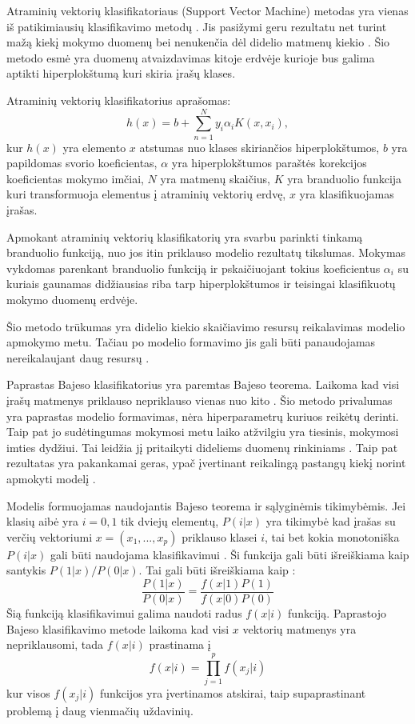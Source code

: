 Atraminių vektorių klasifikatoriaus (Support Vector Machine) metodas yra vienas iš patikimiausių klasifikavimo metodų \cite{Wu2008}. Jis pasižymi geru rezultatu net turint mažą kiekį mokymo duomenų bei nenukenčia dėl didelio matmenų kiekio \cite{Wu2008}. Šio metodo esmė yra duomenų atvaizdavimas kitoje erdvėje kurioje bus galima aptikti hiperplokštumą kuri skiria įrašų klases.

Atraminių vektorių klasifikatorius aprašomas\cite{comp}:
\begin{equation}
    h(x) = b + \sum_{n=1}^{N}y_i \alpha_i K(x, x_i),
\end{equation}
kur $h(x)$ yra elemento $x$ atstumas nuo klases skiriančios hiperplokštumos, $b$ yra papildomas svorio koeficientas, $\alpha$ yra hiperplokštumos paraštės korekcijos koeficientas mokymo imčiai, $N$ yra matmenų skaičius, $K$ yra branduolio funkcija kuri transformuoja elementus į atraminių vektorių erdvę, $x$ yra klasifikuojamas įrašas.

Apmokant atraminių vektorių klasifikatorių yra svarbu parinkti tinkamą branduolio funkciją, nuo jos itin priklauso modelio rezultatų tikslumas. Mokymas vykdomas parenkant branduolio funkciją ir pskaičiuojant tokius koeficientus $\alpha_i$ su kuriais gaunamas didžiausias riba tarp hiperplokštumos ir teisingai klasifikuotų mokymo duomenų erdvėje.

Šio metodo trūkumas yra didelio kiekio skaičiavimo resursų reikalavimas modelio apmokymo metu. Tačiau po modelio formavimo jis gali būti panaudojamas nereikalaujant daug resursų \cite{Wu2008}.

Paprastas Bajeso klasifikatorius yra paremtas Bajeso teorema. Laikoma kad visi įrašų matmenys priklauso nepriklauso vienas nuo kito \cite{comp}. Šio metodo privalumas yra paprastas modelio formavimas, nėra hiperparametrų kuriuos reikėtų derinti. Taip pat jo sudėtingumas mokymosi metu laiko atžvilgiu yra tiesinis, mokymosi imties dydžiui. Tai leidžia jį pritaikyti dideliems duomenų rinkiniams \cite{Wu2008}. Taip pat rezultatas yra pakankamai geras, ypač įvertinant reikalingą pastangų kiekį norint apmokyti modelį \cite{Wu2008}.

  Modelis formuojamas naudojantis Bajeso teorema ir sąlyginėmis tikimybėmis. Jei klasių aibė yra $i = 0, 1$ tik dviejų elementų, $P(i|x)$ yra tikimybė kad įrašas su verčių vektoriumi $x = (x_1, ..., x_p)$ priklauso klasei $i$, tai bet kokia monotoniška $P(i|x)$ gali būti naudojama klasifikavimui \cite{Wu2008}. Ši funkcija gali būti išreiškiama kaip santykis $P(1|x)/P(0|x)$. Tai gali būti išreiškiama kaip \cite{wu2008}:
    \begin{equation}
        \frac{P(1|x)}{P(0|x)} = \frac{f(x|1)P(1)}{f(x|0)P(0)}
    \end{equation}
  Šią funkciją klasifikavimui galima naudoti radus $f(x|i)$ funkciją. Paprastojo Bajeso klasifikavimo metode laikoma kad visi $x$ vektorių matmenys yra nepriklausomi, tada $f(x|i)$ prastinama į \cite{Wu2008}
  \begin{equation}
    f(x|i) = \prod_{j=1}^{p} f(x_j|i)
  \end{equation}
  kur visos $f(x_j|i)$ funkcijos yra įvertinamos atskirai, taip supaprastinant problemą į daug  vienmačių uždavinių.

